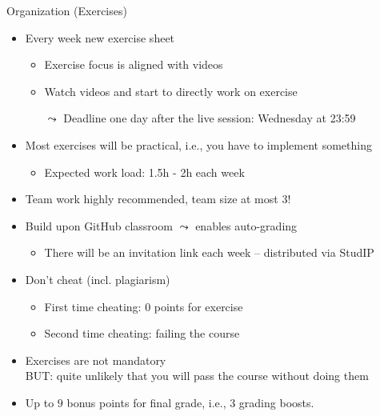 \documentclass[aspectratio=169]{../latex_main/tntbeamer}  %
\begin{document}
\begin{frame}[c]{Organization (Exercises)}

\begin{itemize}
  \item Every week new exercise sheet
  \begin{itemize}
      \item Exercise focus is aligned with videos
      \item Watch videos and start to directly work on exercise 
      \item[$\leadsto$] \alert{Deadline one day after the live session: Wednesday at 23:59}
  \end{itemize}
  \item Most exercises will be practical, i.e., you have to implement something
  \begin{itemize}
    \item Expected work load: 1.5h - 2h each week
  \end{itemize}
  \item Team work highly recommended, team size at most 3! 
  \item Build upon GitHub classroom $\leadsto$ enables auto-grading
  \begin{itemize}
      \item There will be an invitation link each week -- distributed via StudIP
  \end{itemize}
  \pause
  \item Don't cheat (incl. plagiarism)
  \begin{itemize}
    \item First time cheating: $0$ points for exercise
    \item Second time cheating: failing the course
  \end{itemize}
  \pause
  \item Exercises are not mandatory\\ \alert{BUT: quite unlikely that you will pass the course without doing them}
  \pause
  \item Up to \alert{$9$ bonus points} for final grade, i.e., 3 grading boosts.
\end{itemize}

\end{frame}
\end{document}
